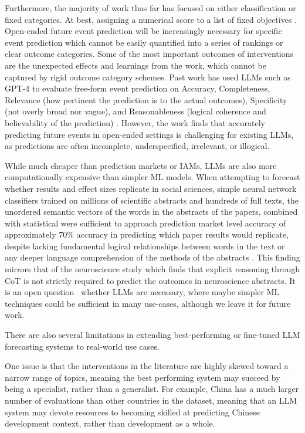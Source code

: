 \documentclass[12pt,a4paper]{article}
\begin{document}
Furthermore, the majority of work thus far has focused on either classification or fixed categories. At best, assigning a numerical score to a list of fixed objectives  . Open-ended future event prediction will be increasingly necessary for specific event prediction which cannot be easily quantified into a series of rankings or clear outcome categories. Some of the most important outcomes of interventions are the unexpected effects and learnings from the work, which cannot be captured by rigid outcome category schemes. Past work has used LLMs such as GPT-4 to evaluate free-form event prediction on Accuracy, Completeness, Relevance (how pertinent the prediction is to the actual outcomes), Specificity (not overly broad nor vague), and Reasonableness (logical coherence and believability of the prediction) . However, the work finds that accurately predicting future events in open-ended settings is challenging for existing LLMs, as predictions are often incomplete, underspecified, irrelevant, or illogical.

While much cheaper than prediction markets or IAMs, LLMs are also more computationally expensive than simpler ML models. When attempting to forecast whether results and effect sizes replicate in social sciences, simple neural network classifiers trained on millions of scientific abstracts and hundreds of full texts, the unordered semantic vectors of the words in the abstracts of the papers, combined with statistical  were sufficient to approach prediction market level accuracy of approximately 70\% accuracy in predicting which paper results would replicate, despite lacking fundamental logical relationships between words in the text or any deeper language comprehension of the methods of the abstracts . This finding mirrors that of the neuroscience study  which finds that explicit reasoning through CoT is not strictly required to predict the outcomes in neuroscience abstracts. It is an open question \ABSTRACT\ whether LLMs are necessary, where maybe simpler ML techniques could be sufficient in many use-cases, although we leave it for future work.

There are also several limitations in extending best-performing or fine-tuned LLM forecasting systems to real-world use cases.

One issue is that the interventions in the literature are highly skewed toward a narrow range of topics, meaning the best performing system may succeed by being a specialist, rather than a generalist. For example, China has a much larger number of evaluations than other countries in the dataset, meaning that an LLM system may devote resources to becoming skilled at predicting Chinese development context, rather than development as a whole.
\end{document}
